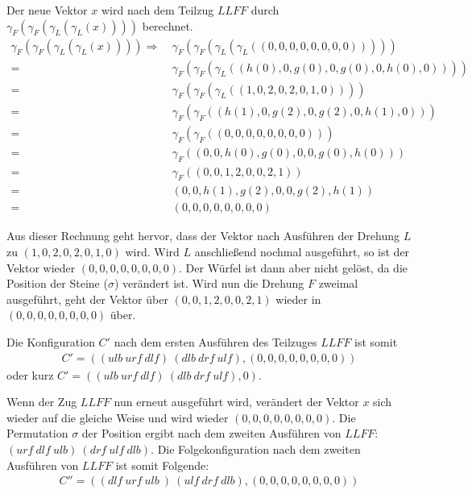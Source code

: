 \documentclass[12pt,a4paper, usenames, dvipsnames]{article}
\theoremstyle{mystyle}
\theoremstyle{definition}
\begin{document}
Der neue Vektor $x$ wird nach dem Teilzug $LLFF$ durch $\gamma_F(\gamma_F(\gamma_L(\gamma_L(x))))$ berechnet. 
\begin{align*}
 \gamma_F(\gamma_F(\gamma_L(\gamma_L(x)))) \Rightarrow \ & \gamma_F(\gamma_F(\gamma_L(\gamma_L((0,0,0,0,0,0,0,0))))) \\
= \ & \gamma_F(\gamma_F(\gamma_L((h(0),0,g(0),0,g(0),0,h(0),0)))) \\
= \ & \gamma_F(\gamma_F(\gamma_L((1,0,2,0,2,0,1,0)))) \\
= \ & \gamma_F(\gamma_F((h(1),0,g(2),0,g(2),0,h(1),0))) \\
= \ & \gamma_F(\gamma_F((0,0,0,0,0,0,0,0))) \\
= \ & \gamma_F((0,0,h(0),g(0),0,0,g(0),h(0))) \\
= \ & \gamma_F((0,0,1,2,0,0,2,1)) \\
= \ & (0,0,h(1),g(2),0,0,g(2),h(1)) \\
= \ & (0,0,0,0,0,0,0,0)
\end{align*}

Aus dieser Rechnung geht hervor, dass der Vektor nach Ausführen der Drehung $L$ zu $(1,0,2,0,2,0,1,0)$ wird. Wird $L$ anschließend nochmal ausgeführt, so ist der Vektor wieder $(0,0,0,0,0,0,0,0)$. Der Würfel ist dann aber nicht gelöst, da die Position der Steine ($\sigma$) verändert ist.
Wird nun die Drehung $F$ zweimal ausgeführt, geht der Vektor über $(0,0,1,2,0,0,2,1)$ wieder in  $(0,0,0,0,0,0,0,0)$ über. 

Die Konfiguration $C'$ nach dem ersten Ausführen des Teilzuges $LLFF$ ist somit 
\begin{align*}
C' = ((\textit{ulb} \ \textit{urf} \ \textit{dlf} )\ ( \textit{dlb} \ \textit{drf} \ \textit{ulf} ),(0,0,0,0,0,0,0,0))
\end{align*} 
oder kurz $C' = ((\textit{ulb} \ \textit{urf} \ \textit{dlf} ) \ (\textit{dlb} \ \textit{drf} \ \textit{ulf} ),0)$.

Wenn der Zug $LLFF$ nun erneut ausgeführt wird, verändert der Vektor $x$ sich wieder auf die gleiche Weise und wird wieder $(0,0,0,0,0,0,0,0)$. Die Permutation $\sigma$ der Position ergibt nach dem zweiten Ausführen von $LLFF$: $( \textit{urf} \ \textit{dlf} \ \textit{ulb} ) \ ( \textit{drf} \ \textit{ulf} \ \textit{dlb} )$. Die Folgekonfiguration nach dem zweiten Ausführen von $LLFF$ ist somit Folgende:
\begin{align*}
C'' = (( \textit{dlf} \ \textit{urf} \ \textit{ulb} \ )  \ ( \textit{ulf} \ \textit{drf} \ \textit{dlb} ),(0,0,0,0,0,0,0,0))
\end{align*} 
\end{document}
